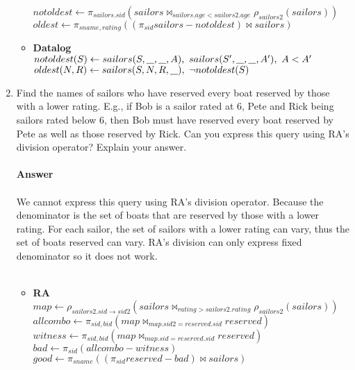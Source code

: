 \documentclass{article}
\newcommand{\anyvar}{\underline{\hspace{0.8em}}}
\newcommand{\RA}{\textbf{RA}}
\newcommand{\DL}{\textbf{Datalog}}
\begin{document}
\begin{enumerate}
\begin{itemize}
	$ notoldest \gets \pi_{sailors.sid}(sailors \bowtie_{sailors.age < sailors2.age} \rho_{sailors2}(sailors))$ \\
	$ oldest \gets \pi_{sname, rating}((\pi_{sid} sailors - notoldest) \bowtie sailors) $
	\item \DL \\
	$ notoldest(S) \gets sailors(S, \anyvar, \anyvar, A),\ sailors(S', \anyvar, \anyvar, A'),\ A < A' $ \\
	$ oldest(N, R) \gets sailors(S, N, R, \anyvar),\ \neg notoldest(S) $
	\end{itemize}
\item Find the names of sailors who have reserved every boat reserved by those with a lower rating. E.g., if Bob is a sailor rated at 6, Pete and Rick being sailors rated below 6, then Bob must have reserved every boat reserved by Pete as well as those reserved by Rick. Can you express this query using RA's division operator? Explain your answer.\\
\\
\textbf{Answer}\\
\\
We cannot express this query using RA's division operator. Because the denominator is the set of boats that are reserved by those with a lower rating. For each sailor, the set of sailors with a lower rating can vary, thus the set of boats reserved can vary. RA's division can only express fixed denominator so it does not work.\\
\\
\begin{itemize}
	\item \RA \\
	$ map \gets \rho_{sailors2.sid \to sid2}(sailors \bowtie_{rating > sailors2.rating} \rho_{sailors2} (sailors)) $ \\
	$ allcombo \gets \pi_{sid, bid}(map \bowtie_{map.sid2 = reserved.sid} reserved) $ \\
	$ witness \gets \pi_{sid, bid}(map \bowtie_{map.sid = reserved.sid} reserved)$ \\
	$ bad \gets \pi_{sid} (allcombo - witness) $ \\
	$ good \gets \pi_{sname}((\pi_{sid} reserved - bad) \bowtie sailors) $ \\
	

\end{itemize}
\end{enumerate}
\end{document}
